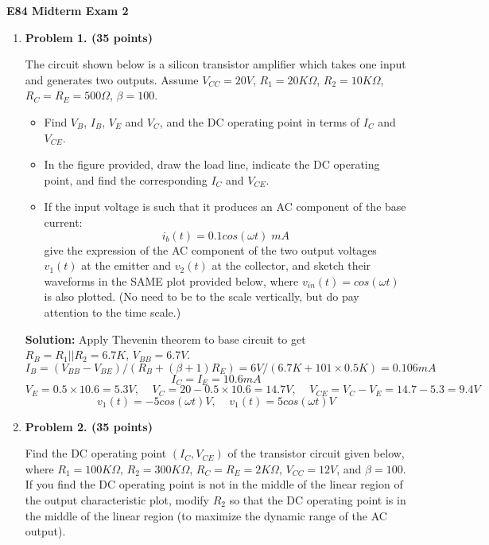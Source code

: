\usepackage{html}

\begin{center}
{\Large \bf E84 Midterm Exam 2}
\end{center}


\begin{enumerate}

\item {\bf Problem 1. (35 points)} 


The circuit shown below is a silicon transistor amplifier which takes one
input and generates two outputs. Assume $V_{CC}=20V$, $R_1=20K\Omega$,
$R_2=10K\Omega$, $R_C=R_E=500\Omega$, $\beta=100$. 

\begin{itemize}
\item Find $V_B$, $I_B$, $V_E$ and $V_C$, and the DC operating point in 
terms of $I_C$ and $V_{CE}$. 
\item In the figure provided, draw the load line, indicate the DC operating 
point, and find the corresponding $I_C$ and $V_{CE}$.
\item If the input voltage is such that it produces an AC component of the 
base current:
\[	i_b(t)=0.1 cos(\omega t) \; mA	\]
give the expression of the AC component of the two output voltages $v_1(t)$ 
at the emitter and $v_2(t)$ at the collector, and sketch their waveforms in 
the SAME plot provided below, where $v_{in}(t)=cos(\omega t)$ is also plotted.
(No need to be to the scale vertically, but do pay attention to the time
scale.)
\end{itemize}


 {\bf Solution:} 
 Apply Thevenin theorem to base circuit to get $R_B=R_1 || R_2=6.7K$, $V_{BB}=6.7V$.
 \[ I_B=(V_{BB}-V_{BE})/(R_B+(\beta+1)R_E)=6V/(6.7K+101\times 0.5K)=0.106 mA \]
 \[ I_C=I_E=10.6 mA \]
 \[ V_E=0.5\times 10.6=5.3V,\;\;\;\; V_C=20-0.5\times 10.6=14.7V,\;\;\;\;
 	V_{CE}=V_C-V_E=14.7-5.3=9.4V \]
 \[ v_1(t)=-5 cos(\omega t) V,\;\;\;\;v_1(t)=5 cos(\omega t) V	\]


\item {\bf Problem 2. (35 points)} 

Find the DC operating point $(I_C, V_{CE})$ of the transistor circuit 
given below, where $R_1=100K\Omega$, $R_2=300K\Omega$, $R_C=R_E=2K\Omega$, 
$V_{CC}=12V$, and $\beta=100$. If you find the DC operating point is not 
in the middle of the linear region of the output characteristic plot, 
modify $R_2$ so that the DC operating point is in the middle of the linear
region (to maximize the dynamic range of the AC output).


\end{enumerate}
